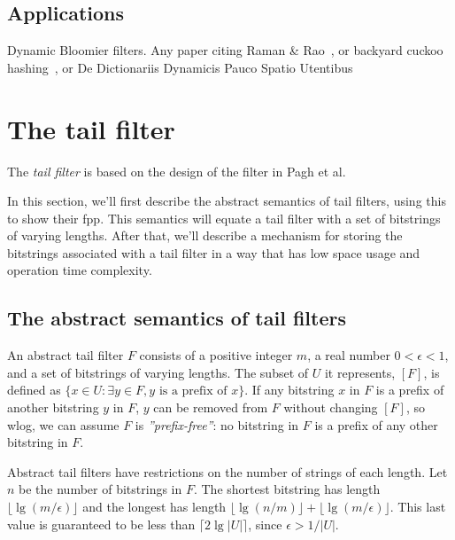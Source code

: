 \documentclass[11pt,letterpaper]{article}
\begin{document}
\subsection{Applications}

Dynamic Bloomier filters. Any paper citing Raman \& Rao~\cite{raman2003succinct}, or backyard cuckoo hashing~\cite{DBLP:journals/corr/abs-0912-5424}, or De Dictionariis Dynamicis Pauco Spatio Utentibus~\cite{DBLP:journals/corr/abs-cs-0512081}

\section{The tail filter}

The {\em tail filter} is based on the design of the filter in Pagh et al.~\cite{DBLP:journals/corr/abs-1304-1188}

In this section, we'll first describe the abstract semantics of tail filters, using this to show their fpp.
This semantics will equate a tail filter with a set of bitstrings of varying lengths.
After that, we'll describe a mechanism for storing the bitstrings associated with a tail filter in a way that has low space usage and operation time complexity.

\subsection{The abstract semantics of tail filters}

An abstract tail filter $F$ consists of a positive integer $m$, a real number $0 < \epsilon < 1$, and a set of bitstrings of varying lengths. %
The subset of $U$ it represents, $[F]$, is defined as $\{x \in U : \exists y \in F, y \textrm{ is a prefix of } x\}$.
If any bitstring $x$ in $F$ is a prefix of another bitstring $y$ in $F$, $y$ can be removed from $F$ without changing $[F]$, so wlog, we can assume $F$ is {\em ''prefix-free''}: no bitstring in $F$ is a prefix of any other bitstring in $F$.


Abstract tail filters have restrictions on the number of strings of each length.
Let $n$ be the number of bitstrings in $F$.
The shortest bitstring has length $\lfloor \lg (m / \epsilon) \rfloor$ and the longest has length $\lfloor \lg (n/m) \rfloor + \lfloor \lg (m / \epsilon) \rfloor$.
This last value is guaranteed to be less than $\lceil 2 \lg |U| \rceil$, since $\epsilon > 1/|U|$.
\end{document}
